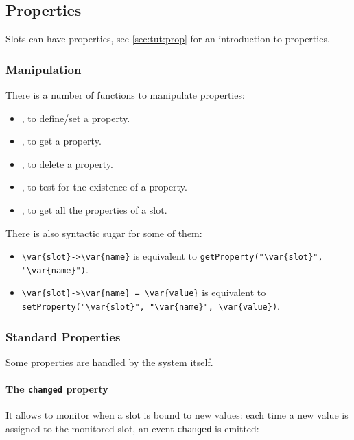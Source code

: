 \subsection{Properties}
\label{sec:lang:prop}
Slots can have properties, see \autoref{sec:tut:prop} for an introduction to
properties.

\subsubsection{Manipulation}

There is a number of functions to manipulate properties:
\begin{itemize}
\item {}, to define/set a property.
\item {}, to get a property.
\item {}, to delete a property.
\item {}, to test for the existence of a
  property.
\item {}, to get all the properties of a slot.
\end{itemize}

There is also syntactic sugar for some of them:

\begin{itemize}
\item \lstinline|\var{slot}->\var{name}| is equivalent to
  \lstinline[style=varInString]|getProperty("\var{slot}", "\var{name}")|.
\item \lstinline|\var{slot}->\var{name} = \var{value}| is equivalent to
  \lstinline[style=varInString]|setProperty("\var{slot}", "\var{name}", \var{value})|.
\end{itemize}

\subsubsection{Standard Properties}
\label{sec:lang:prop:std}

Some properties are handled by the system itself.


\paragraph{The \lstinline|changed| property}

It allows to monitor when a slot is bound to new values: each time a new
value is assigned to the monitored slot, an event \lstinline|changed| is
emitted:


